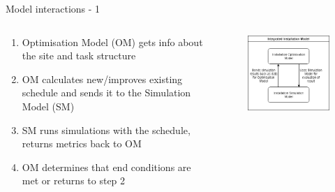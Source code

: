 \documentclass{beamer}
\begin{document}
\begin{frame}{Model interactions - 1}
\begin{columns}
	\begin{column}{0.5\textwidth}
		\begin{enumerate}
			\item Optimisation Model (OM) gets info about the site and task structure
			\item OM calculates new/improves existing schedule and sends it to the Simulation Model (SM)
			\item SM runs simulations with the schedule, returns metrics back to OM
			\item OM determines that end conditions are met or returns to step 2
		\end{enumerate}
	\end{column}

	\begin{column}{0.5\textwidth}
		\begin{figure}[t]
 			\includegraphics[width=\textwidth]{Installation}
			\centering
		\end{figure}
	\end{column}
\end{columns}
\end{frame}
\end{document}
